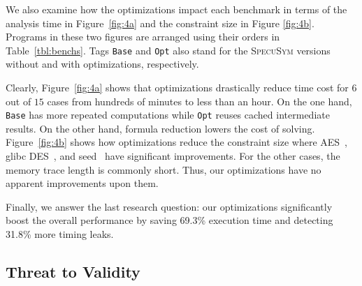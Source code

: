 \documentclass[sigconf]{acmart}
\newcommand{\SpecuSym}{\textsc{SpecuSym} }
\begin{document}
\begin{table}%
\caption{Overall performance Increases from Optimization. }
\label{tbl:opt}
\centering
{}
\vspace{-2ex}
\end{table}







We also examine how the optimizations impact each benchmark in terms of 
the analysis time in Figure~\ref{fig:4a} and the constraint size in Figure
\ref{fig:4b}. Programs in these two figures are arranged using their orders 
in Table~\ref{tbl:benchs}. Tags \texttt{Base} and \texttt{Opt} also stand 
for the \SpecuSym versions without and with optimizations, respectively. 


Clearly, Figure~\ref{fig:4a} shows that optimizations drastically reduce 
time cost for $6$ out of $15$ cases from hundreds of minutes to less than 
an hour. On the one hand, \texttt{Base} has more repeated computations 
while \texttt{Opt} reuses cached intermediate results. On the other hand, 
formula reduction lowers the cost of solving. Figure~\ref{fig:4b} shows 
how optimizations reduce the constraint size where AES~\cite{LibTomCrypt}, 
glibc DES~\cite{glibc}, and seed~\cite{Tegra} have significant improvements. 
For the other cases, the memory trace length is commonly short. Thus, our 
optimizations have no apparent improvements upon them.


Finally, we answer the last research question: our optimizations significantly 
boost the overall performance by saving 69.3\% execution time and detecting 
31.8\% more timing leaks.



\subsection{Threat to Validity}
\label{sec:threat}
\end{document}
